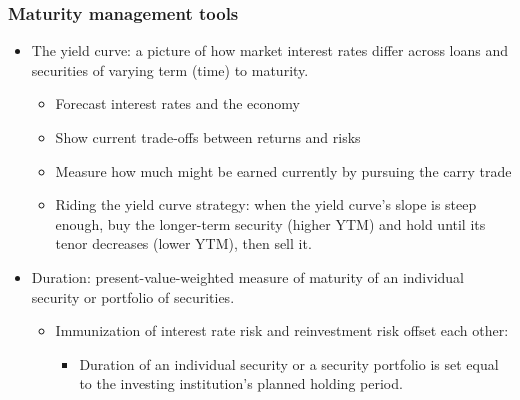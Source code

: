 \subsubsection{Maturity management tools}
\begin{itemize}
\item The yield curve: a picture of how market interest rates differ across loans and securities of varying term (time) to maturity.
    \begin{itemize}
    \item Forecast interest rates and the economy
    \item Show current trade-offs between returns and risks
    \item Measure how much might be earned currently by pursuing the carry trade
    \item Riding the yield curve strategy: when the yield curve's slope is steep enough, buy the longer-term security (higher YTM) and hold until its tenor decreases (lower YTM), then sell it.
    \end{itemize}
    
\item Duration: present-value-weighted measure of maturity of an individual security or portfolio of securities.
    \begin{itemize}
    \item Immunization of interest rate risk and reinvestment risk offset each other:
        \begin{itemize}
        \item  Duration of an individual security or a security portfolio is set equal to the investing institution's planned holding period.
        \end{itemize}
        
   
    \end{itemize}
    
\end{itemize}




